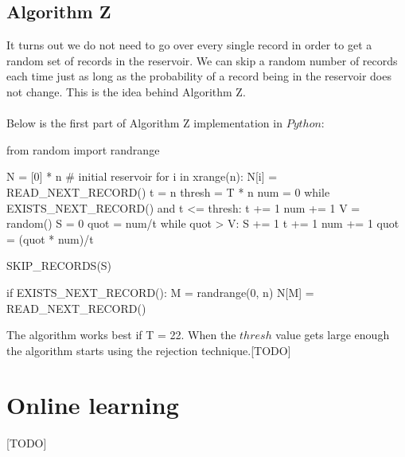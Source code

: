 \documentclass[journal]{IEEEtran/IEEEtran}
\begin{document}
\subsection{Algorithm Z}
It turns out we do not need to go over every single record in order to get a random set of records in the reservoir. We can skip a random number of records each time just as long as the probability of a record being in the reservoir does not change. This is the idea behind Algorithm Z.\\ \\
Below is the first part of Algorithm Z implementation in $Python$:\\
\begin{code}
from random import randrange

N = [0] * n # initial reservoir
for i in xrange(n):
	N[i] = READ_NEXT_RECORD()
t = n
thresh = T * n
num = 0
while EXISTS_NEXT_RECORD() and t <= thresh:
	t += 1
	num += 1
	V = random()
	S = 0
	quot = num/t
	while quot > V:
		S += 1
		t += 1
		num += 1
		quot = (quot * num)/t
	
	SKIP_RECORDS(S)
	
	if EXISTS_NEXT_RECORD():
		M = randrange(0, n)
		N[M] = READ_NEXT_RECORD()
\end{code}
The algorithm works best if T = 22. When the $thresh$ value gets large enough the algorithm starts using the rejection technique.[TODO]  
\section{Online learning}
[TODO]



%
%
\end{document}
